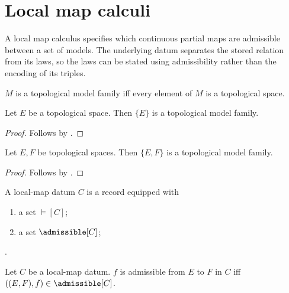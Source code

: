 \section{Local map calculi}



A local map calculus specifies which continuous partial maps are admissible
between a set of models. The underlying datum separates the stored relation
from its laws, so the laws can be stated using admissibility rather than the
encoding of its triples.

\begin{definition}\label{topological_model_family}
    $M$ is a topological model family iff
        every element of $M$ is a topological space.
\end{definition}

\begin{classification}\label{singleton_topological_model_family}
    Let $E$ be a topological space.
    Then $\{E\}$ is a topological model family.
\end{classification}
\begin{proof}
    Follows by .
\end{proof}

\begin{classification}\label{pair_topological_model_family}
    Let $E,F$ be topological spaces.
    Then $\{E,F\}$ is a topological model family.
\end{classification}
\begin{proof}
    Follows by .
\end{proof}

\begin{struct}\label{local_map_datum}
    A local-map datum $C$ is a record equipped with
    \begin{enumerate}
        \item a set $\models[C]$;
        \item a set $\admissible[C]$;
    \end{enumerate}.
\end{struct}

\begin{definition}\label{map_admissible}
    Let $C$ be a local-map datum.
    $f$ is admissible from $E$ to $F$ in $C$ iff
        $((E,F),f)\in\admissible[C]$.
\end{definition}

